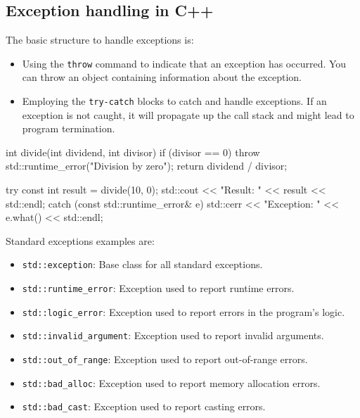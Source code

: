 \subsection{Exception handling in C++}

The basic structure to handle exceptions is:
\begin{itemize}
    \item Using the \texttt{throw} command to indicate that an exception has occurred. You can throw an
    object containing information about the exception.
    \item Employing the \texttt{try-catch} blocks to catch and handle exceptions. If an exception is not
    caught, it will propagate up the call stack and might lead to program termination.
\end{itemize}

\begin{exampleblock}
    \begin{codeblock}[language=C++]
int divide(int dividend, int divisor) {
    if (divisor == 0) {
        throw std::runtime_error("Division by zero");
    }
    return dividend / divisor;
}

try{
    const int result = divide(10, 0);
    std::cout << "Result: " << result << std::endl;
} catch (const std::runtime_error& e) {
    std::cerr << "Exception: " << e.what() << std::endl;
}
    \end{codeblock}
\end{exampleblock}

Standard exceptions examples are:
\begin{itemize}
    \item \texttt{std::exception}: Base class for all standard exceptions.
    \item \texttt{std::runtime\_error}: Exception used to report runtime errors.
    \item \texttt{std::logic\_error}: Exception used to report errors in the program's logic.
    \item \texttt{std::invalid\_argument}: Exception used to report invalid arguments.
    \item \texttt{std::out\_of\_range}: Exception used to report out-of-range errors.
    \item \texttt{std::bad\_alloc}: Exception used to report memory allocation errors.
    \item \texttt{std::bad\_cast}: Exception used to report casting errors.
\end{itemize}

